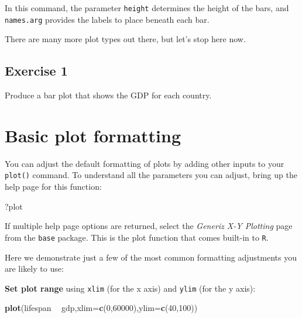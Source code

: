 \documentclass[
]{book}
\newenvironment{Shaded}{\begin{snugshade}}{\end{snugshade}}
\newcommand{\DataTypeTok}[1]{\textcolor[rgb]{0.13,0.29,0.53}{#1}}
\newcommand{\DecValTok}[1]{\textcolor[rgb]{0.00,0.00,0.81}{#1}}
\newcommand{\KeywordTok}[1]{\textcolor[rgb]{0.13,0.29,0.53}{\textbf{#1}}}
\newcommand{\NormalTok}[1]{#1}
\newcommand{\OperatorTok}[1]{\textcolor[rgb]{0.81,0.36,0.00}{\textbf{#1}}}
\newcommand{\StringTok}[1]{\textcolor[rgb]{0.31,0.60,0.02}{#1}}
\begin{document}
In this command, the parameter \texttt{height} determines the height of the bars, and \texttt{names.arg} provides the labels to place beneath each bar.

There are many more plot types out there, but let's stop here now.

\hypertarget{exercise-1-4}{%
\subsection*{Exercise 1}\label{exercise-1-4}}

Produce a bar plot that shows the GDP for each country.

\hypertarget{basic-plot-formatting}{%
\section*{Basic plot formatting}\label{basic-plot-formatting}}

You can adjust the default formatting of plots by adding other inputs to your \texttt{plot()} command. To understand all the parameters you can adjust, bring up the help page for this function:

\begin{Shaded}
\begin{Highlighting}[]
\NormalTok{?plot}
\end{Highlighting}
\end{Shaded}

If multiple help page options are returned, select the \emph{Generiz X-Y Plotting} page from the \texttt{base} package. This is the plot function that comes built-in to \texttt{R}.

Here we demonstrate just a few of the most common formatting adjustments you are likely to use:

\textbf{Set plot range} using \texttt{xlim} (for the x axis) and \texttt{ylim} (for the y axis):

\begin{Shaded}
\begin{Highlighting}[]
\KeywordTok{plot}\NormalTok{(lifespan }\OperatorTok{~}\StringTok{ }\NormalTok{gdp,}\DataTypeTok{xlim=}\KeywordTok{c}\NormalTok{(}\DecValTok{0}\NormalTok{,}\DecValTok{60000}\NormalTok{),}\DataTypeTok{ylim=}\KeywordTok{c}\NormalTok{(}\DecValTok{40}\NormalTok{,}\DecValTok{100}\NormalTok{))}
\end{Highlighting}
\end{Shaded}
\end{document}
